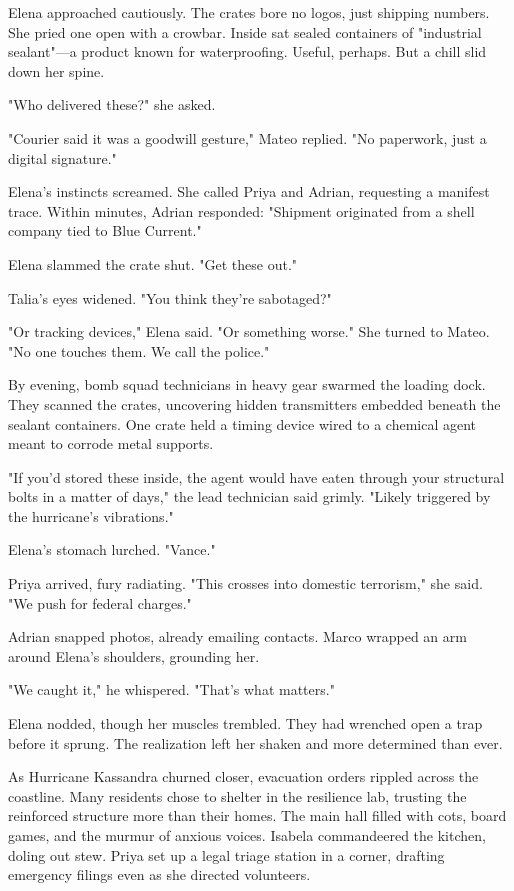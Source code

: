 Elena approached cautiously. The crates bore no logos, just shipping numbers. She pried one open with a crowbar. Inside sat sealed containers of "industrial sealant"—a product known for waterproofing. Useful, perhaps. But a chill slid down her spine.

"Who delivered these?" she asked.

"Courier said it was a goodwill gesture," Mateo replied. "No paperwork, just a digital signature."

Elena's instincts screamed. She called Priya and Adrian, requesting a manifest trace. Within minutes, Adrian responded: "Shipment originated from a shell company tied to Blue Current."

Elena slammed the crate shut. "Get these out."

Talia's eyes widened. "You think they're sabotaged?"

"Or tracking devices," Elena said. "Or something worse." She turned to Mateo. "No one touches them. We call the police."

By evening, bomb squad technicians in heavy gear swarmed the loading dock. They scanned the crates, uncovering hidden transmitters embedded beneath the sealant containers. One crate held a timing device wired to a chemical agent meant to corrode metal supports.

"If you'd stored these inside, the agent would have eaten through your structural bolts in a matter of days," the lead technician said grimly. "Likely triggered by the hurricane's vibrations."

Elena's stomach lurched. "Vance."

Priya arrived, fury radiating. "This crosses into domestic terrorism," she said. "We push for federal charges."

Adrian snapped photos, already emailing contacts. Marco wrapped an arm around Elena's shoulders, grounding her.

"We caught it," he whispered. "That's what matters."

Elena nodded, though her muscles trembled. They had wrenched open a trap before it sprung. The realization left her shaken and more determined than ever.

\bigskip

As Hurricane Kassandra churned closer, evacuation orders rippled across the coastline. Many residents chose to shelter in the resilience lab, trusting the reinforced structure more than their homes. The main hall filled with cots, board games, and the murmur of anxious voices. Isabela commandeered the kitchen, doling out stew. Priya set up a legal triage station in a corner, drafting emergency filings even as she directed volunteers.

